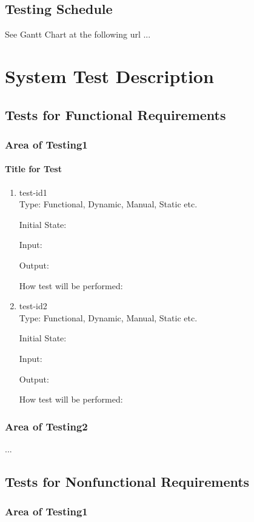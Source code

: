\documentclass[12pt, titlepage]{article}
\begin{document}
	\subsection{Testing Schedule}
	
	See Gantt Chart at the following url ...
	\section{System Test Description}
	
	\subsection{Tests for Functional Requirements}
	\subsubsection{Area of Testing1}
	
	\paragraph{Title for Test}
	\begin{enumerate}
		\item{test-id1\\}
		Type: Functional, Dynamic, Manual, Static etc.
		
		Initial State: 
		
		Input: 
		
		Output: 
		
		How test will be performed: 
		
		\item{test-id2\\}
		Type: Functional, Dynamic, Manual, Static etc.
		
		Initial State: 
		
		Input: 
		
		Output: 
		
		How test will be performed: 
	\end{enumerate}
	\subsubsection{Area of Testing2}
	...
	\subsection{Tests for Nonfunctional Requirements}
	\subsubsection{Area of Testing1}
	
\end{document}
